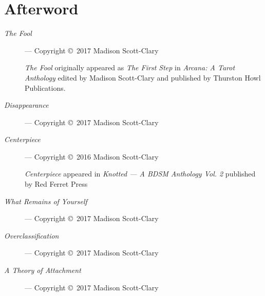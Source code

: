 \chapter*{Afterword}

\begin{description}
    \item[\emph{The Fool}]
    --- Copyright ©~2017 Madison Scott-Clary

    \emph{The Fool} originally appeared as \emph{The First Step} in \emph{Arcana: A Tarot Anthology} edited by Madison Scott-Clary and published by Thurston Howl Publications.
    \item[\emph{Disappearance}]
    --- Copyright ©~2017 Madison Scott-Clary
    \item[\emph{Centerpiece}]
    --- Copyright ©~2016 Madison Scott-Clary

    \emph{Centerpiece} appeared in \emph{Knotted --- A BDSM Anthology Vol. 2} published by Red Ferret Press
    \item[\emph{What Remains of Yourself}]
    --- Copyright ©~2017 Madison Scott-Clary
    \item[\emph{Overclassification}]
    --- Copyright ©~2017 Madison Scott-Clary
    \item[\emph{A Theory of Attachment}]
    --- Copyright ©~2017 Madison Scott-Clary
\end{description}
